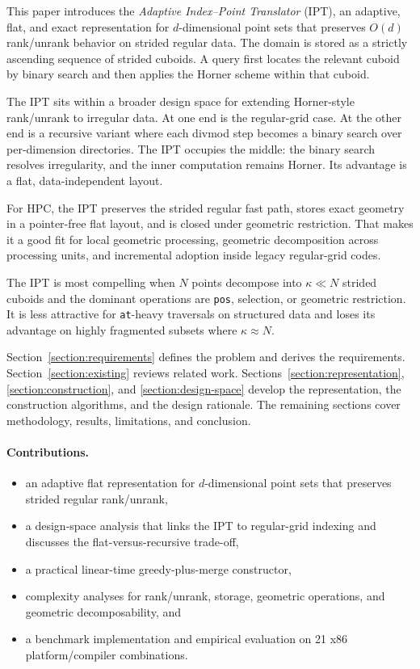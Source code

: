 \documentclass[manuscript,screen,review]{acmart}
\theoremstyle{definition}
\theoremstyle{plain}
\begin{document}
This paper introduces the \emph{Adaptive Index--Point Translator}
(IPT), an adaptive, flat, and exact representation for $d$-dimensional
point sets that preserves $O(d)$ rank/unrank behavior on strided
regular data. The domain is stored as a strictly ascending sequence of
strided cuboids. A query first locates the relevant cuboid by binary
search and then applies the Horner scheme within that cuboid.

The IPT sits within a broader design space for extending Horner-style
rank/unrank to irregular data. At one end is the regular-grid case.
At the other end is a recursive variant where each divmod step becomes
a binary search over per-dimension directories. The IPT occupies the
middle: the binary search resolves irregularity, and the inner
computation remains Horner. Its advantage is a flat, data-independent
layout.

For HPC, the IPT preserves the strided regular fast path, stores
exact geometry in a pointer-free flat layout, and is closed under
geometric restriction. That makes it a good fit for local geometric
processing, geometric decomposition across processing units, and
incremental adoption inside legacy regular-grid codes.

The IPT is most compelling when $N$ points decompose into
$\kappa\ll N$ strided cuboids and the dominant operations are
\texttt{pos}, selection, or geometric restriction. It is less
attractive for \texttt{at}-heavy traversals on structured data and
loses its advantage on highly fragmented subsets where
$\kappa \approx N$.

Section~\ref{section:requirements} defines the problem and derives the
requirements. Section~\ref{section:existing} reviews related work.
Sections~\ref{section:representation}, \ref{section:construction}, and
\ref{section:design-space} develop the representation, the
construction algorithms, and the design rationale. The remaining
sections cover methodology, results, limitations, and conclusion.

\paragraph{Contributions.}
\begin{itemize}[leftmargin=*,nosep]
  \item an adaptive flat representation for $d$-dimensional
    point sets that preserves strided regular rank/unrank,
  \item a design-space analysis that links the IPT to regular-grid
    indexing and discusses the flat-versus-recursive trade-off,
  \item a practical linear-time greedy-plus-merge constructor,
  \item complexity analyses for rank/unrank, storage, geometric
    operations, and geometric decomposability, and
  \item a benchmark implementation and empirical evaluation on
    21 x86 platform/compiler combinations.
\end{itemize}
\end{document}
